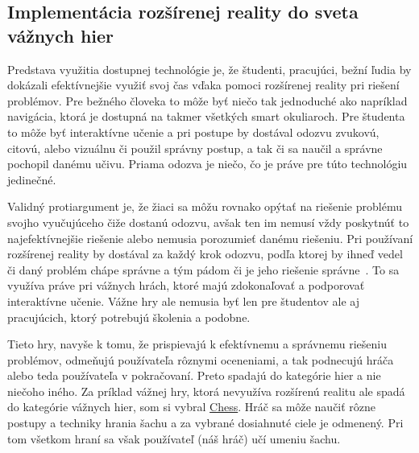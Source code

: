 \documentclass[10pt,twoside,a4paper]{article}
\begin{document}
\subsection{Implementácia rozšírenej reality do sveta vážnych hier}
\par Predstava využitia dostupnej technológie je, že študenti, pracujúci, bežní ľudia by dokázali efektívnejšie využiť svoj čas vďaka pomoci rozšírenej reality pri riešení problémov. Pre bežného človeka to môže byť niečo tak jednoduché ako napríklad navigácia, ktorá je dostupná na takmer všetkých smart okuliaroch. Pre študenta to môže byť interaktívne učenie a pri postupe by dostával odozvu zvukovú, citovú, alebo vizuálnu či použil správny postup, a tak či sa naučil a správne pochopil danému učivu. Priama odozva je niečo, čo je práve pre túto technológiu jedinečné. \par Validný protiargument je, že žiaci sa môžu rovnako opýtať na riešenie problému svojho vyučujúceho čiže dostanú odozvu, avšak ten im nemusí vždy poskytnúť to najefektívnejšie riešenie alebo nemusia porozumieť danému riešeniu. Pri používaní rozšírenej reality by dostával za každý krok odozvu, podľa ktorej by ihneď vedel či daný problém chápe správne a tým pádom či je jeho riešenie správne~\cite{DevelopementofARgames}. To sa využíva práve pri vážnych hrách, ktoré majú zdokonaľovať a podporovať interaktívne učenie. Vážne hry ale nemusia byť len pre študentov ale aj pracujúcich, ktorý potrebujú školenia a podobne. \par Tieto hry, navyše k tomu, že prispievajú k efektívnemu a správnemu riešeniu problémov, odmeňujú používateľa rôznymi oceneniami, a tak podnecujú hráča alebo teda používateľa v pokračovaní. Preto spadajú do kategórie hier a nie niečoho iného. Za príklad vážnej hry, ktorá nevyužíva rozšírenú realitu ale spadá do kategórie vážnych hier, som si vybral \href{https://www.chess.com/}{Chess}. Hráč sa môže naučiť rôzne postupy a techniky hrania šachu a za vybrané dosiahnuté ciele je odmenený. Pri tom všetkom hraní sa však používateľ (náš hráč) učí umeniu šachu.
\end{document}
